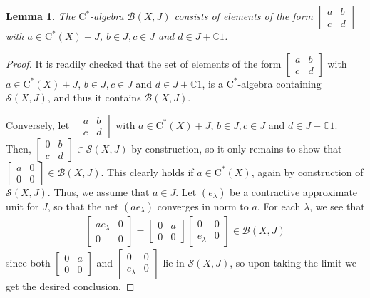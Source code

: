 \documentclass[10pt]{amsart}
\newcommand{\bC}{{\mathbb{C}}}
\newcommand{\B}{{\mathcal{B}}}
\renewcommand{\S}{{\mathcal{S}}}
\newcommand{\rC}{\mathrm{C}}
\newtheorem{lemma}{Lemma}[section]
\theoremstyle{definition}
\begin{document}
\begin{lemma}\label{L:JinB}
The $\rC^*$-algebra $\B(X,J)$ consists of elements of the form $\begin{bmatrix} a & b \\ c & d\end{bmatrix}$ with $a\in \rC^*(X)+J$, $b\in J, c\in J$ and $d\in J+\bC 1$.
\end{lemma}
\begin{proof}
It is readily checked that the set of elements of the form $\begin{bmatrix} a & b \\ c & d\end{bmatrix}$ with $a\in \rC^*(X)+J$, $b\in J,c\in J$ and $d\in J+\bC 1$, is a $\rC^*$-algebra containing $\S(X,J)$, and thus it contains $\B(X,J)$.

Conversely, let $\begin{bmatrix} a & b \\ c & d\end{bmatrix}$ with $a\in \rC^*(X)+J$, $b\in J,c\in J$ and $d\in J+\bC 1$. Then,
$
\begin{bmatrix} 0 & b\\ c & d\end{bmatrix}\in \S(X,J)
$
by construction, so it only remains to show that $
\begin{bmatrix} a & 0\\ 0 & 0\end{bmatrix}\in \B(X,J).
$
This clearly holds if $a\in \rC^*(X)$, again by construction of $\S(X,J)$.  Thus, we  assume that $a\in J$. Let $(e_\lambda)$ be a contractive approximate unit for $J$, so that the net $(ae_\lambda)$ converges in norm to $a$. For each $\lambda$, we see that
\begin{align*}
\begin{bmatrix} ae_\lambda & 0 \\ 0 & 0\end{bmatrix}=\begin{bmatrix} 0 & a \\ 0 & 0\end{bmatrix}\begin{bmatrix} 0 & 0 \\ e_\lambda & 0\end{bmatrix}\in \B(X,J)
\end{align*}
since  both $\begin{bmatrix} 0 & a \\ 0 & 0\end{bmatrix}$ and $\begin{bmatrix} 0 & 0 \\ e_\lambda & 0\end{bmatrix}$ lie in $\S(X,J)$, so upon taking the limit we get the desired conclusion.
\end{proof}
\end{document}

